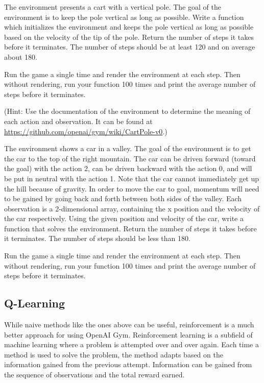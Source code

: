 \begin{problem}
The environment  presents a cart with a vertical pole.
The goal of the environment is to keep the pole vertical as long as possible.
Write a function  which initializes the environment and keeps the pole vertical as long as possible based on the velocity of the tip of the pole.
Return the number of steps it takes before it terminates. The number of steps should be at least 120 and on average about 180.

Run the game a single time and render the environment at each step. Then without rendering, run your function 100 times and print the average number of steps before it terminates.

(Hint: Use the documentation of the environment to determine the meaning of each action and observation.
It can be found at \url{https://github.com/openai/gym/wiki/CartPole-v0}.)
\label{prob:cartpole}
\end{problem}

\begin{problem}
The environment  shows a car in a valley.
The goal of the environment is to get the car to the top of the right mountain.
The car can be driven forward (toward the goal) with the action 2, can be driven backward with the action 0, and will be put in neutral with the action 1.
Note that the car cannot immediately get up the hill because of gravity.
In order to move the car to goal, momentum will need to be gained by going back and forth between both sides of the valley.
Each observation is a 2-dimensional array, containing the x position and the velocity of the car respectively.
Using the given position and velocity of the car, write a function  that solves the  environment.
Return the number of steps it takes before it terminates.
The number of steps should be less than 180.

Run the game a single time and render the environment at each step. Then without rendering, run your function 100 times and print the average number of steps before it terminates.


\label{prob:car}
\end{problem}

\subsection*{Q-Learning}
While naive methods like the ones above can be useful, reinforcement is a much better approach for using OpenAI Gym.
Reinforcement learning is a subfield of machine learning where a problem is attempted over and over again. Each time a method is used to solve the problem, the method adapts based on the information gained from the previous attempt.
Information can be gained from the sequence of observations and the total reward earned.

